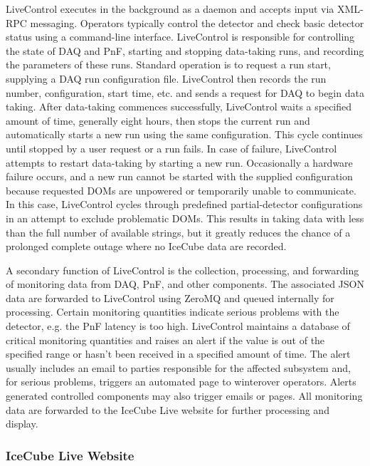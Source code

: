 LiveControl executes in the background as a daemon and accepts input
via XML-RPC messaging.  Operators typically control the detector and check basic
detector status using a command-line interface.  LiveControl is responsible
for controlling the state of DAQ and PnF, starting and
stopping data-taking runs, and recording the parameters of these runs.
Standard operation is to request a run start, supplying a DAQ run configuration
file.  LiveControl then records the run number, configuration, start time,
etc. and sends a request 
for DAQ to begin data taking.  After data-taking commences successfully,
LiveControl waits a specified amount of time, generally eight hours, then
stops the current run and automatically starts a new run using the same
configuration.  This cycle continues until stopped by a user request or a
run fails.  In case of failure, LiveControl attempts to restart data-taking
by starting a new run.  Occasionally a hardware failure occurs, and a new
run cannot be started with the supplied configuration because requested
DOMs are unpowered or temporarily unable to communicate.  In this case,
LiveControl cycles through predefined partial-detector 
configurations in an attempt to exclude problematic DOMs.  This results in
taking data with less than the full number of available strings, but it
greatly reduces the chance of a prolonged complete outage where no IceCube
data are recorded.

A secondary function of LiveControl is the collection, processing, and
forwarding of monitoring data from DAQ, PnF, and other
components.  The associated JSON data are forwarded to LiveControl using ZeroMQ and queued internally
for processing.  Certain monitoring quantities indicate serious problems with
the detector, e.g. the PnF latency is too high.  LiveControl
maintains a database of critical monitoring quantities and raises an alert
if the value is out of the specified range or 
hasn't been received in a specified amount of time.  The alert usually
includes an email to parties responsible for the affected subsystem and,
for serious problems, triggers an automated page to winterover operators.
Alerts generated controlled components may also trigger emails or pages.
All monitoring data are forwarded to the IceCube Live website for further
processing and display. 

\subsubsection{IceCube Live Website}

